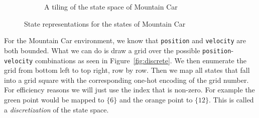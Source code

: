 \documentclass[11pt,addpoints,answers]{exam}
\begin{document}
\begin{figure}[H]
\begin{subfigure}{0.5\textwidth}
\caption{A tiling of the state space of Mountain Car}
\label{fig:tiling}
\end{subfigure}

\caption{State representations for the states of Mountain Car}
\label{fig:states}
\end{figure}

For the Mountain Car environment, we know that \texttt{position} and \texttt{velocity} are both bounded. What we can do is draw a grid over the possible \texttt{position}-\texttt{velocity} combinations as seen in Figure~\ref{fig:discrete}. We then enumerate the grid from bottom left to top right, row by row. Then we map all states that fall into a grid square with the corresponding one-hot encoding of the grid number. For efficiency reasons we will just use the index that is non-zero. For example the green point would be mapped to $\{6\}$ and the orange point to $\{12\}$. This is called a \emph{discretization} of the state space.
\end{document}
